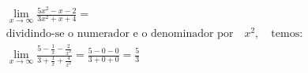 \begin{ex}
\begin{align}
&\lim_{x\rightarrow \infty} \frac{5x^2-x-2}{3x^2+x+4}=\nonumber\\
&\text{dividindo-se o numerador e o denominador por}\quad{x^2},\quad\text{temos}:\nonumber\\
&\lim_{x\rightarrow \infty} \frac{5-\frac{1}{x}-\frac{2}{x^2}}{3+\frac{1}{x}+\frac{4}{x^2}}=\frac{5-0-0}{3+0+0}=\frac{5}{3}\nonumber
\end{align}
\end{ex}

